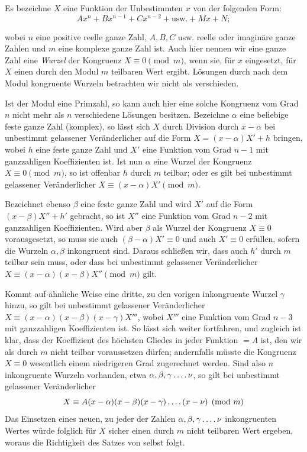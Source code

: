 Es bezeichne $X$ eine Funktion der Unbestimmten $x$ von der folgenden Form:
\[
Ax^n+Bx^{n-1}+Cx^{n-2}+\text{usw.}+Mx+N;
\]

%
wobei $n$ eine positive reelle ganze Zahl, $A,B,C$ usw. reelle oder imaginäre ganze Zahlen und $m$ eine komplexe ganze Zahl ist. Auch hier nennen wir eine ganze Zahl eine \emph{Wurzel} der Kongruenz $X\equiv0\pmod m$, wenn sie, für $x$ eingesetzt, für $X$ einen durch den Modul $m$ teilbaren Wert ergibt. Lösungen durch nach dem Modul kongruente Wurzeln betrachten wir nicht als verschieden.

Ist der Modul eine Primzahl, so kann auch hier eine solche Kongruenz vom Grad $n$ nicht mehr als $n$ verschiedene Lösungen besitzen. Bezeichne $\alpha$ eine beliebige feste ganze Zahl (komplex), so lässt sich $X$ durch Division durch $x-\alpha$ bei unbestimmt gelassener Veränderlicher auf die Form $X=(x-\alpha)X'+h$ bringen, wobei $h$ eine feste ganze Zahl und $X'$ eine Funktion vom Grad $n-1$ mit ganzzahligen Koeffizienten ist. Ist nun $\alpha$ eine Wurzel der Kongruenz $X\equiv0\pmod m$, so ist offenbar $h$ durch $m$ teilbar; oder es gilt bei unbestimmt gelassener Veränderlicher $X\equiv(x-\alpha)X'\pmod m$.

Bezeichnet ebenso $\beta$ eine feste ganze Zahl und wird $X'$ auf die Form $(x-\beta)X''+h'$ gebracht, so ist $X''$ eine Funktion vom Grad $n-2$ mit ganzzahligen Koeffizienten. Wird aber $\beta$ als Wurzel der Kongruenz $X\equiv0$ vorausgesetzt, so muss sie auch $(\beta-\alpha)X'\equiv0$ und auch $X'\equiv0$ erfüllen, sofern die Wurzeln $\alpha,\beta$ inkongruent sind. Daraus schließen wir, dass auch $h'$ durch $m$ teilbar sein muss, oder dass bei unbestimmt gelassener Veränderlicher $X\equiv(x-\alpha)(x-\beta)X''\pmod m$ gilt.

Kommt auf ähnliche Weise eine dritte, zu den vorigen inkongruente Wurzel $\gamma$ hinzu, so gilt bei unbestimmt gelassener Veränderlicher $X\equiv(x-\alpha)(x-\beta)(x-\gamma)X'''$, wobei $X'''$ eine Funktion vom Grad $n-3$ mit ganzzahligen Koeffizienten ist. So lässt sich weiter fortfahren, und zugleich ist klar, dass der Koeffizient des höchsten Gliedes in jeder Funktion $=A$ ist, den wir als durch $m$ nicht teilbar voraussetzen dürfen; andernfalls müsste die Kongruenz $X\equiv0$ wesentlich einem niedrigeren Grad zugerechnet werden. Sind also $n$ inkongruente Wurzeln vorhanden, etwa $\alpha,\beta,\gamma\mathinner{.\,.\,.\,.}\nu$, so gilt bei unbestimmt gelassener Veränderlicher
\[
X\equiv A(x-\alpha)(x-\beta)(x-\gamma)\mathinner{.\,.\,.\,.}(x-\nu)\pmod m
\]
Das Einsetzen eines neuen, zu jeder der Zahlen $\alpha,\beta,\gamma\mathinner{.\,.\,.\,.}\nu$ inkongruenten Wertes würde folglich für $X$ sicher einen durch $m$ nicht teilbaren Wert ergeben, woraus die Richtigkeit des Satzes von selbst folgt.

